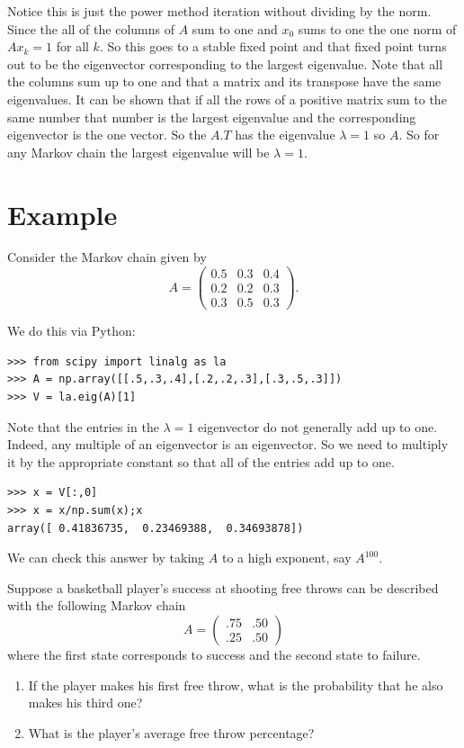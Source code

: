 Notice this is just the power method iteration without dividing by the norm. Since the all of the columns of $A$ sum to one and $x_0$ sums to one the one norm of $Ax_k=1$ for all $k$. So this goes to a stable fixed point and that fixed point turns out to be the eigenvector corresponding to the largest eigenvalue. Note that all the columns sum up to one and that a matrix and its transpose have the same eigenvalues. It can be shown that if all the rows of a positive matrix sum to the same number that number is the largest eigenvalue and the corresponding eigenvector is the one vector. So the $A.T$ has the eigenvalue $\lambda=1$ so $A$. So for any Markov chain the largest eigenvalue will be $\lambda=1$.

\section*{Example}
Consider the Markov chain given by
\[
A = \begin{pmatrix}
0.5 & 0.3 & 0.4\\
0.2 & 0.2 & 0.3\\
0.3 & 0.5 & 0.3
\end{pmatrix}.
\]

We do this via Python:
\begin{lstlisting}
>>> from scipy import linalg as la
>>> A = np.array([[.5,.3,.4],[.2,.2,.3],[.3,.5,.3]])
>>> V = la.eig(A)[1]
\end{lstlisting}
Note that the entries in the $\lambda=1$ eigenvector do not generally add up to one.
Indeed, any multiple of an eigenvector is an eigenvector.
So we need to multiply it by the appropriate constant so that all of the entries add up to one.
\begin{lstlisting}
>>> x = V[:,0]
>>> x = x/np.sum(x);x
array([ 0.41836735,  0.23469388,  0.34693878])
\end{lstlisting}
We can check this answer by taking $A$ to a high exponent, say $A^{100}$.

\begin{problem}
Suppose a basketball player's success at shooting free throws can be described with the following Markov chain
\[
A = \begin{pmatrix}.75&.50\\.25&.50\end{pmatrix}
\]
where the first state corresponds to success and the second state to failure.
\begin{enumerate}
\item If the player makes his first free throw, what is the probability that he also makes his third one?
\item What is the player's average free throw percentage?
\end{enumerate}
\end{problem}

